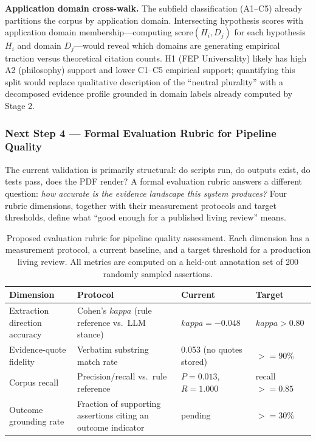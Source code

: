 \documentclass[
  english,
]{article}
\begin{document}
\textbf{Application domain cross-walk.} The subfield classification
(A1--C5) already partitions the corpus by application domain.
Intersecting hypothesis scores with application domain
membership---computing \(\text{score}(H_i, D_j)\) for each hypothesis
\(H_i\) and domain \(D_j\)---would reveal which domains are generating
empirical traction versus theoretical citation counts. H1 (FEP
Universality) likely has high A2 (philosophy) support and lower C1--C5
empirical support; quantifying this split would replace qualitative
description of the ``neutral plurality'' with a decomposed evidence
profile grounded in domain labels already computed by Stage 2.

\subsubsection{Next Step 4 --- Formal Evaluation Rubric for Pipeline
Quality}\label{next-step-4-formal-evaluation-rubric-for-pipeline-quality}

The current validation is primarily structural: do scripts run, do
outputs exist, do tests pass, does the PDF render? A formal evaluation
rubric answers a different question: \emph{how accurate is the evidence
landscape this system produces?} Four rubric dimensions, together with
their measurement protocols and target thresholds, define what ``good
enough for a published living review'' means.

\begin{table}[htbp]
\centering
\caption{Proposed evaluation rubric for pipeline quality assessment. Each dimension has a measurement protocol, a current baseline, and a target threshold for a production living review. All metrics are computed on a held-out annotation set of 200 randomly sampled assertions.}
\label{tab:eval_rubric}
\begin{tabular}{llll}
\toprule
\textbf{Dimension} & \textbf{Protocol} & \textbf{Current} & \textbf{Target} \\
\midrule
Extraction direction accuracy & Cohen's $kappa$ (rule reference vs.\ LLM stance) & $kappa = -0.048$ & $kappa > 0.80$ \\
Evidence-quote fidelity & Verbatim substring match rate & 0.053 (no quotes stored) & $>= 90\%$ \\
Corpus recall & Precision/recall vs.\ rule reference & $P = 0.013$, $R = 1.000$ & recall $>= 0.85$ \\
Outcome grounding rate & Fraction of supporting assertions citing an outcome indicator & pending & $>= 30\%$ \\
\bottomrule
\end{tabular}
\end{table}
\end{document}

